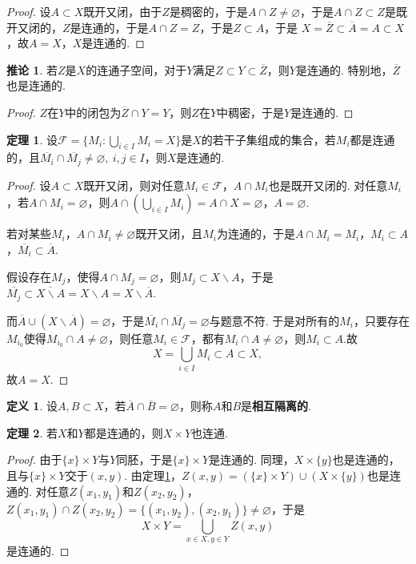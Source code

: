 \documentclass[12pt]{ctexart}
\theoremstyle{definition}
\newtheorem{definition}{定义}
\newtheorem{theorem}{定理}
\newtheorem{corollary}{推论}
\theoremstyle{plain}
\begin{document}
	\begin{proof}
		设$A\subset X$既开又闭，由于$Z$是稠密的，于是$A\cap Z\neq\varnothing$，于是$A\cap Z\subset Z$是既开又闭的，$Z$是连通的，于是$A\cap Z=Z$，于是$Z\subset A$，于是
		$X=\overline{Z}\subset\overline{A}=A\subset X$，故$A=X$，$X$是连通的.
	\end{proof}
	\begin{corollary}
		若$Z$是$X$的连通子空间，对于$Y$满足$Z\subset Y\subset\overline{Z}$，则$Y$是连通的. 特别地，$\overline{Z}$也是连通的.
	\end{corollary}
	\begin{proof}
		$Z$在$Y$中的闭包为$\overline{Z}\cap Y=Y$，则$Z$在$Y$中稠密，于是$Y$是连通的.
	\end{proof}
	\begin{theorem}\label{kebab}
		设$\mathcal{F}=\{M_i:\bigcup_{i\in I} M_i=X\}$是$X$的若干子集组成的集合，若$M_i$都是连通的，且$\overline{M_i}\cap \overline{M_j}\neq\varnothing,\ i,j\in I$，则$X$是连通的.
	\end{theorem}
	\begin{proof}
		设$A\subset X$既开又闭，则对任意$M_i\in\mathcal{F}$，$A\cap M_i$也是既开又闭的. 对任意$M_i$，若$A\cap M_i=\varnothing$，则$A\cap\left(\bigcup_{i\in I}M_i\right)=A\cap X=\varnothing$，$A=\varnothing$. 
		
		若对某些$M_i$，$A\cap M_i\neq\varnothing$既开又闭，且$M_i$为连通的，于是$A\cap M_i=M_i$，$M_i\subset A$，$\overline{M_i}\subset\overline{A}$.
		
		假设存在$M_j$，使得$A\cap M_j=\varnothing$，则$M_j\subset X\backslash A$，于是$\overline{M_j}\subset\overline{X\backslash A}=X\backslash A=X\backslash\overline{A}$.
		
		而$\overline{A}\cup\left(X\backslash\overline{A}\right)=\varnothing$，于是$\overline{M_i}\cap\overline{M_j}=\varnothing$与题意不符. 于是对所有的$M_i$，只要存在$M_{i_0}$使得$M_{i_0}\cap A\neq\varnothing$，则任意$M_i\in\mathcal{F}$，都有$M_i\cap A\neq\varnothing$，则$M_i\subset A$.故
		$$X=\bigcup_{i\in I}M_i\subset A\subset X,$$
		故$A=X$.
	\end{proof}
	\begin{definition}
		设$A,B\subset X$，若$\overline{A}\cap\overline{B}=\varnothing$，则称$A$和$B$是\textbf{相互隔离的}.
	\end{definition}
	\begin{theorem}
		若$X$和$Y$都是连通的，则$X\times Y$也连通.
	\end{theorem}
	\begin{proof}
		由于$\{x\}\times Y$与$Y$同胚，于是$\{x\}\times Y$是连通的. 同理，$X\times \{y\}$也是连通的，且与$\{x\}\times Y$交于$(x,y)$. 由定理\ref{kebab}，$Z(x,y)=\left(\{x\}\times Y\right)\cup\left(X\times \{y\}\right)$也是连通的. 对任意$Z(x_1,y_1)$和$Z(x_2,y_2)$，$Z(x_1,y_1)\cap Z(x_2,y_2)=\{(x_1,y_2),(x_2,y_1)\}\neq\varnothing$，于是
		$$X\times Y=\bigcup_{x\in X, y\in Y}Z(x,y)$$
		是连通的.
	\end{proof}
\end{document}
